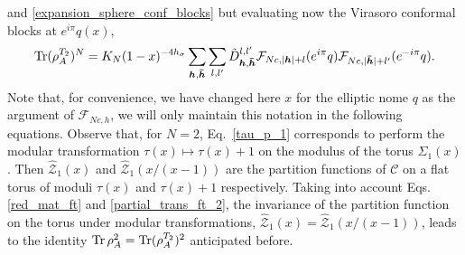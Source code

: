 \documentclass[a4paper,11pt]{article}
\def\Tr{\mathop{\mbox{\normalfont Tr}}\nolimits}
\begin{document}
and \eqref{expansion_sphere_conf_blocks} but evaluating now
the Virasoro conformal blocks at $e^{i\pi}q(x)$,
\begin{equation}\label{partial_trans_cb}
 \Tr(\rho_A^{T_2})^N=K_N(1-x)^{-4h_\sigma}\sum_{\boldsymbol{h}, \boldsymbol{\bar{h}}}\sum_{l, l'} 
 \tilde{D}_{\boldsymbol{h}, \boldsymbol{\bar{h}}}^{l, l'} 
 \mathcal{F}_{Nc, |\boldsymbol{h}|+l}(e^{i\pi}q)\mathcal{F}_{Nc, |\boldsymbol{\bar{h}}|+l'}(e^{-i\pi}q).
\end{equation}
Note that, for convenience, we have changed here $x$ for the elliptic nome $q$ 
as the argument of $\mathcal{F}_{Nc, h}$, we will only maintain this notation in 
the following equations. Observe that, for $N=2$, Eq.~\eqref{tau_p_1} corresponds to perform the modular 
transformation $\tau(x)\mapsto \tau(x)+1$ on the modulus of the torus $\Sigma_1(x)$.
Then $\hat{\mathcal{Z}}_1(x)$ and $\hat{\mathcal{Z}}_1(x/(x-1))$ are the partition functions
of $\mathcal{C}$ on a flat torus of moduli $\tau(x)$ and $\tau(x)+1$ respectively. Taking into account Eqs.
\eqref{red_mat_ft} and \eqref{partial_trans_ft_2}, the invariance of the partition function on the torus under modular transformations, 
$\hat{\mathcal{Z}}_1(x)=\hat{\mathcal{Z}}_1(x/(x-1))$, leads to the identity $\Tr\rho_A^2=\Tr(\rho_A^{T_2})^2$ anticipated before.
\end{document}
